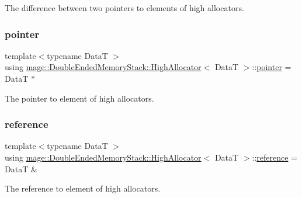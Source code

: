 The difference between two pointers to elements of high allocators. \hypertarget{structmage_1_1_double_ended_memory_stack_1_1_high_allocator_a97e4dbd7053c951de9e444d95a70809d}{}\label{structmage_1_1_double_ended_memory_stack_1_1_high_allocator_a97e4dbd7053c951de9e444d95a70809d} 
\subsubsection{\texorpdfstring{pointer}{pointer}}
{\footnotesize\ttfamily template$<$typename DataT $>$ \\
using \hyperlink{structmage_1_1_double_ended_memory_stack_1_1_high_allocator}{mage\+::\+Double\+Ended\+Memory\+Stack\+::\+High\+Allocator}$<$ DataT $>$\+::\hyperlink{structmage_1_1_double_ended_memory_stack_1_1_high_allocator_a97e4dbd7053c951de9e444d95a70809d}{pointer} =  DataT $\ast$}

The pointer to element of high allocators. \hypertarget{structmage_1_1_double_ended_memory_stack_1_1_high_allocator_ad037b00a52ebac3f03afd81bc16db9df}{}\label{structmage_1_1_double_ended_memory_stack_1_1_high_allocator_ad037b00a52ebac3f03afd81bc16db9df} 
\subsubsection{\texorpdfstring{reference}{reference}}
{\footnotesize\ttfamily template$<$typename DataT $>$ \\
using \hyperlink{structmage_1_1_double_ended_memory_stack_1_1_high_allocator}{mage\+::\+Double\+Ended\+Memory\+Stack\+::\+High\+Allocator}$<$ DataT $>$\+::\hyperlink{structmage_1_1_double_ended_memory_stack_1_1_high_allocator_ad037b00a52ebac3f03afd81bc16db9df}{reference} =  DataT \&}

The reference to element of high allocators. \hypertarget{structmage_1_1_double_ended_memory_stack_1_1_high_allocator_a0d2e29171c7898850631b1a57a29fe0d}{}\label{structmage_1_1_double_ended_memory_stack_1_1_high_allocator_a0d2e29171c7898850631b1a57a29fe0d} 

